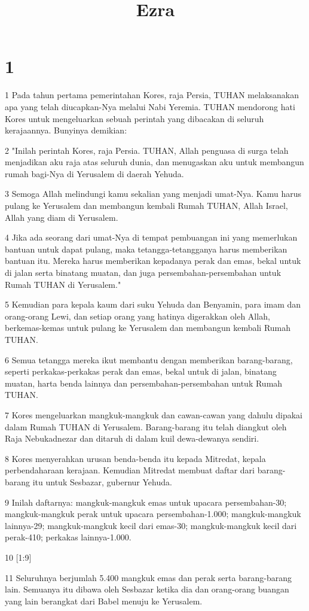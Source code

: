 

\title{Ezra}


\chapter{1}

\par 1 Pada tahun pertama pemerintahan Kores, raja Persia, TUHAN melaksanakan apa yang telah diucapkan-Nya melalui Nabi Yeremia. TUHAN mendorong hati Kores untuk mengeluarkan sebuah perintah yang dibacakan di seluruh kerajaannya. Bunyinya demikian:
\par 2 "Inilah perintah Kores, raja Persia. TUHAN, Allah penguasa di surga telah menjadikan aku raja atas seluruh dunia, dan menugaskan aku untuk membangun rumah bagi-Nya di Yerusalem di daerah Yehuda.
\par 3 Semoga Allah melindungi kamu sekalian yang menjadi umat-Nya. Kamu harus pulang ke Yerusalem dan membangun kembali Rumah TUHAN, Allah Israel, Allah yang diam di Yerusalem.
\par 4 Jika ada seorang dari umat-Nya di tempat pembuangan ini yang memerlukan bantuan untuk dapat pulang, maka tetangga-tetangganya harus memberikan bantuan itu. Mereka harus memberikan kepadanya perak dan emas, bekal untuk di jalan serta binatang muatan, dan juga persembahan-persembahan untuk Rumah TUHAN di Yerusalem."
\par 5 Kemudian para kepala kaum dari suku Yehuda dan Benyamin, para imam dan orang-orang Lewi, dan setiap orang yang hatinya digerakkan oleh Allah, berkemas-kemas untuk pulang ke Yerusalem dan membangun kembali Rumah TUHAN.
\par 6 Semua tetangga mereka ikut membantu dengan memberikan barang-barang, seperti perkakas-perkakas perak dan emas, bekal untuk di jalan, binatang muatan, harta benda lainnya dan persembahan-persembahan untuk Rumah TUHAN.
\par 7 Kores mengeluarkan mangkuk-mangkuk dan cawan-cawan yang dahulu dipakai dalam Rumah TUHAN di Yerusalem. Barang-barang itu telah diangkut oleh Raja Nebukadnezar dan ditaruh di dalam kuil dewa-dewanya sendiri.
\par 8 Kores menyerahkan urusan benda-benda itu kepada Mitredat, kepala perbendaharaan kerajaan. Kemudian Mitredat membuat daftar dari barang-barang itu untuk Sesbazar, gubernur Yehuda.
\par 9 Inilah daftarnya: mangkuk-mangkuk emas untuk upacara persembahan-30; mangkuk-mangkuk perak untuk upacara persembahan-1.000; mangkuk-mangkuk lainnya-29; mangkuk-mangkuk kecil dari emas-30; mangkuk-mangkuk kecil dari perak-410; perkakas lainnya-1.000.
\par 10 [1:9]
\par 11 Seluruhnya berjumlah 5.400 mangkuk emas dan perak serta barang-barang lain. Semuanya itu dibawa oleh Sesbazar ketika dia dan orang-orang buangan yang lain berangkat dari Babel menuju ke Yerusalem.

